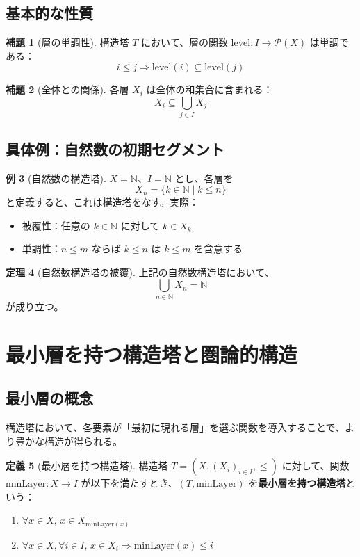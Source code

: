 \documentclass[a4paper,12pt]{article}
\theoremstyle{definition}
\newtheorem{definition}{定義}[section]
\newtheorem{theorem}[definition]{定理}
\newtheorem{lemma}[definition]{補題}
\newtheorem{example}[definition]{例}
\begin{document}
\subsection{基本的な性質}

\begin{lemma}[層の単調性]
構造塔 $T$ において、層の関数 $\text{level} : I \to \mathcal{P}(X)$ は単調である：
\[
i \leq j \Rightarrow \text{level}(i) \subseteq \text{level}(j)
\]
\end{lemma}

\begin{lemma}[全体との関係]
各層 $X_i$ は全体の和集合に含まれる：
\[
X_i \subseteq \bigcup_{j \in I} X_j
\]
\end{lemma}

\subsection{具体例：自然数の初期セグメント}

\begin{example}[自然数の構造塔]
$X = \mathbb{N}$、$I = \mathbb{N}$ とし、各層を
\[
X_n = \{k \in \mathbb{N} \mid k \leq n\}
\]
と定義すると、これは構造塔をなす。実際：
\begin{itemize}
\item 被覆性：任意の $k \in \mathbb{N}$ に対して $k \in X_k$
\item 単調性：$n \leq m$ ならば $k \leq n$ は $k \leq m$ を含意する
\end{itemize}
\end{example}

\begin{theorem}[自然数構造塔の被覆]
上記の自然数構造塔において、
\[
\bigcup_{n \in \mathbb{N}} X_n = \mathbb{N}
\]
が成り立つ。
\end{theorem}

\section{最小層を持つ構造塔と圏論的構造}

\subsection{最小層の概念}

構造塔において、各要素が「最初に現れる層」を選ぶ関数を導入することで、より豊かな構造が得られる。

\begin{definition}[最小層を持つ構造塔]\label{def:structure-tower-min}
構造塔 $T = (X, (X_i)_{i \in I}, \leq)$ に対して、関数 $\text{minLayer} : X \to I$ が以下を満たすとき、$(T, \text{minLayer})$ を\textbf{最小層を持つ構造塔}という：
\begin{enumerate}
\item $\forall x \in X, \, x \in X_{\text{minLayer}(x)}$
\item $\forall x \in X, \forall i \in I, \, x \in X_i \Rightarrow \text{minLayer}(x) \leq i$
\end{enumerate}
\end{definition}
\end{document}
